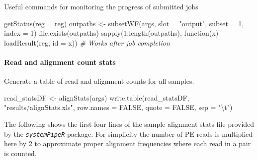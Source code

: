\documentclass[14pt,]{article}
\newcommand{\hlnum}[1]{\textcolor[rgb]{0.816,0.125,0.439}{#1}}%
\newcommand{\hlstr}[1]{\textcolor[rgb]{0.251,0.627,0.251}{#1}}%
\newcommand{\hlcom}[1]{\textcolor[rgb]{0.502,0.502,0.502}{\textit{#1}}}%
\newcommand{\hlstd}[1]{\textcolor[rgb]{0.251,0.251,0.251}{#1}}%
\newcommand{\hlkwd}[1]{\textcolor[rgb]{0.878,0.439,0.125}{#1}}%
\newenvironment{Shaded}{\begin{myshaded}}{\end{myshaded}}
\newcommand{\DecValTok}[1]{\hlnum{#1}}
\newcommand{\ConstantTok}[1]{\hlnum{#1}}
\newcommand{\SpecialCharTok}[1]{\hlstr{#1}}
\newcommand{\StringTok}[1]{\hlstr{#1}}
\newcommand{\CommentTok}[1]{\hlcom{#1}}
\newcommand{\OtherTok}[1]{{#1}}
\newcommand{\FunctionTok}[1]{\hlstd{#1}}
\newcommand{\ControlFlowTok}[1]{\hlkwd{#1}}
\newcommand{\AttributeTok}[1]{{#1}}
\newcommand{\NormalTok}[1]{\hlstd{#1}}
\begin{document}
Useful commands for monitoring the progress of submitted jobs

\begin{Shaded}
\begin{Highlighting}[]
\FunctionTok{getStatus}\NormalTok{(}\AttributeTok{reg =}\NormalTok{ reg)}
\NormalTok{outpaths }\OtherTok{\textless{}{-}} \FunctionTok{subsetWF}\NormalTok{(args, }\AttributeTok{slot =} \StringTok{"output"}\NormalTok{, }\AttributeTok{subset =} \DecValTok{1}\NormalTok{, }\AttributeTok{index =} \DecValTok{1}\NormalTok{)}
\FunctionTok{file.exists}\NormalTok{(outpaths)}
\FunctionTok{sapply}\NormalTok{(}\DecValTok{1}\SpecialCharTok{:}\FunctionTok{length}\NormalTok{(outpaths), }\ControlFlowTok{function}\NormalTok{(x) }\FunctionTok{loadResult}\NormalTok{(reg, }\AttributeTok{id =}\NormalTok{ x))  }\CommentTok{\# Works after job completion}
\end{Highlighting}
\end{Shaded}

\hypertarget{read-and-alignment-count-stats}{%
\paragraph{Read and alignment count stats}\label{read-and-alignment-count-stats}}

Generate a table of read and alignment counts for all samples.

\begin{Shaded}
\begin{Highlighting}[]
\NormalTok{read\_statsDF }\OtherTok{\textless{}{-}} \FunctionTok{alignStats}\NormalTok{(args)}
\FunctionTok{write.table}\NormalTok{(read\_statsDF, }\StringTok{"results/alignStats.xls"}\NormalTok{, }\AttributeTok{row.names =} \ConstantTok{FALSE}\NormalTok{, }\AttributeTok{quote =} \ConstantTok{FALSE}\NormalTok{, }
    \AttributeTok{sep =} \StringTok{"}\SpecialCharTok{\textbackslash{}t}\StringTok{"}\NormalTok{)}
\end{Highlighting}
\end{Shaded}

The following shows the first four lines of the sample alignment stats file
provided by the \emph{\texttt{systemPipeR}} package. For simplicity the number of PE reads
is multiplied here by 2 to approximate proper alignment frequencies where each
read in a pair is counted.
\end{document}
